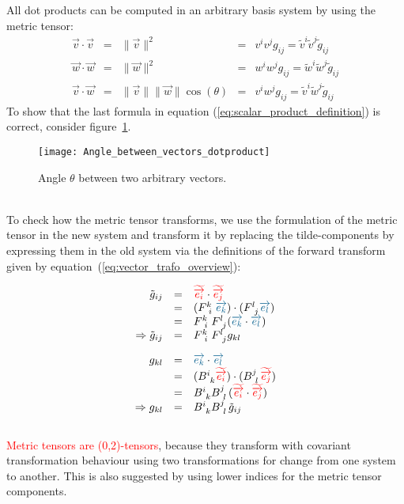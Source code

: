 All dot products can be computed in an arbitrary basis system by using the metric
tensor:
\begin{equation}
    \label{eq:scalar_product_definition}
    \begin{array}{rclrcl}
        \vec{v} \cdot \vec{v} & = & \|\vec{v}\|^2 & = & v^i v^j g_{ij} = \tilde{v}^i \tilde{v}^j \tilde{g}_{ij} \\
        \vec{w} \cdot \vec{w} & = & \|\vec{w}\|^2 & = & w^i w^j g_{ij} = \tilde{w}^i \tilde{w}^j \tilde{g}_{ij} \\
        \vec{v} \cdot \vec{w} & = & \|\vec{v}\|  \|\vec{w}\| \cos(\theta) & = & v^i w^j g_{ij}  = \tilde{v}^i \tilde{w}^j \tilde{g}_{ij}
    \end{array}
\end{equation}
To show that the last formula in equation (\ref{eq:scalar_product_definition}) is correct,
consider figure~\ref{fig:angle_between_arbitrary_vectors}.
\begin{figure}[h]
    \centering
    \texttt{[image: Angle\_between\_vectors\_dotproduct]}
    \caption{Angle $\theta$ between two arbitrary vectors.}
    \label{fig:angle_between_arbitrary_vectors}
\end{figure} \\

To check how the metric tensor transforms, we use the formulation of the metric tensor in
the new system and transform it by replacing the tilde-components by expressing them in
the old system via the definitions of the forward transform given by
equation~(\ref{eq:vector_trafo_overview}):

\begin{equation}
    \begin{array}{rcl}
        \tilde{g}_{ij} & = & \hdbtv{i} \cdot \hdbtv{j} \\
                       & = & (F^{k~}_{~i}\hdbv{k}) \cdot (F^{l~}_{~j}\hdbv{l}) \\
                       & = & F^{k~}_{~i}  F^{l~}_{~j} (\hdbv{k} \cdot \hdbv{l}) \\
        \Rightarrow\tilde{g}_{ij} & = & F^{k~}_{~i}  F^{l~}_{~j} {g}_{kl} \\
        \noalign{\vskip10pt}
        g_{kl} & = & \hdbv{k} \cdot \hdbv{l} \\
        & = & (B^{i~}_{~k}\hdbtv{i}) \cdot (B^{j~}_{~l}\hdbtv{j}) \\
        & = & B^{i~}_{~k} B^{j~}_{~l} (\hdbtv{i} \cdot \hdbtv{j}) \\
        \Rightarrow g_{kl} & = & B^{i~}_{~k} B^{j~}_{~l}  \tilde{g}_{ij}
    \end{array}
\end{equation} \\

\textcolor{red}{Metric tensors are (0,2)-tensors}, because they transform with covariant
transformation behaviour using two transformations for change from one system to another.
This is also suggested by using lower indices for the metric tensor components. \\


\newpage